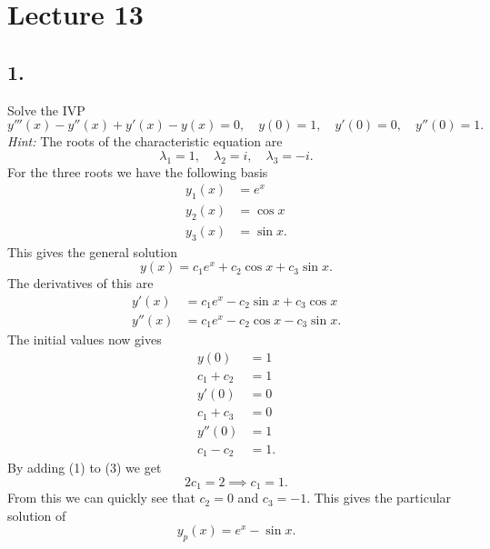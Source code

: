 \section*{Lecture 13}

\subsection*{1.} Solve the IVP
\[ 
y'''(x) - y''(x) + y'(x) - y(x) = 0, \quad y(0) = 1, \quad y'(0) = 0, \quad y''(0) = 1
.\]
\textit{Hint:} The roots of the characteristic equation are
\[ 
\lambda_1 = 1, \quad \lambda_2 = i, \quad \lambda_3 = -i
.\]
\bigbreak
For the three roots we have the following basis
\begin{align*}
  y_1(x) &= e^{x} \\
  y_2(x) &= \cos x \\
  y_3(x) &= \sin x
.\end{align*}
This gives the general solution
\[ 
y(x) = c_1e^{x} + c_2 \cos x + c_3 \sin x
.\]
The derivatives of this are
\begin{align*}
  y'(x) &= c_1 e^{x} - c_2 \sin x + c_3 \cos x \\
  y''(x) &= c_1 e^{x} - c_2 \cos x - c_3 \sin x
.\end{align*}
The initial values now gives
\begin{align*}
  y(0) &= 1 \\
  c_1 + c_2 &= 1 \\
  y'(0) &= 0 \\
  c_1 + c_3 &= 0 \\
  y''(0) &= 1 \\
  c_1 - c_2 &= 1
.\end{align*}
By adding (1) to (3) we get
\[ 
2c_1 = 2 \implies c_1 = 1
.\]
From this we can quickly see that $c_2 = 0$ and $c_3 = -1$. This gives the particular solution of
\[ 
y_p(x) = e^{x} - \sin x
.\]


